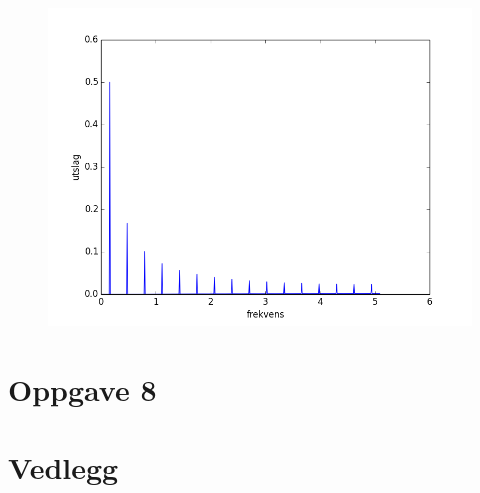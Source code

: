 \documentclass[norsk,a4paper,12pt]{article}
\begin{document}
\begin{figure}[H]
\includegraphics[width=15cm]{oppgave16.png}
\end{figure}

\section*{Oppgave 8}


\section*{Vedlegg}










\end{document}

